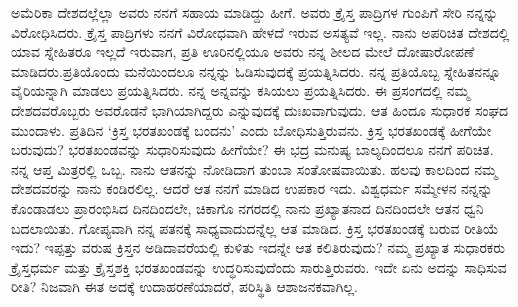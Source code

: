 ಅಮೆರಿಕಾ ದೇಶದಲ್ಲೆಲ್ಲಾ ಅವರು ನನಗೆ ಸಹಾಯ ಮಾಡಿದ್ದು ಹೀಗೆ. ಅವರು ಕ್ರೈಸ್ತ ಪಾದ್ರಿಗಳ ಗುಂಪಿಗೆ ಸೇರಿ ನನ್ನನ್ನು ವಿರೋಧಿಸಿದರು. ಕ್ರೈಸ್ತ ಪಾದ್ರಿಗಳು ನನಗೆ ವಿರೋಧವಾಗಿ ಹೇಳದೆ ಇರುವ ಅಸತ್ಯವೆ ಇಲ್ಲ. ನಾನು ಅಪರಿಚಿತ ದೇಶದಲ್ಲಿ ಯಾವ ಸ್ನೇಹಿತರೂ ಇಲ್ಲದೆ ಇರುವಾಗ, ಪ್ರತಿ ಊರಿ\-ನಲ್ಲಿಯೂ ಅವರು ನನ್ನ ಶೀಲದ ಮೇಲೆ ದೋಷಾರೋಪಣೆ ಮಾಡಿದರು.\break ಪ್ರತಿಯೊಂದು ಮನೆಯಿಂದಲೂ ನನ್ನನ್ನು ಓಡಿಸುವುದಕ್ಕೆ ಪ್ರಯತ್ನಿಸಿದರು. ನನ್ನ ಪ್ರತಿಯೊಬ್ಬ ಸ್ನೇಹಿತನನ್ನೂ ವೈರಿಯನ್ನಾಗಿ ಮಾಡಲು ಪ್ರಯತ್ನಿಸಿದರು. ನನ್ನ ಅನ್ನವನ್ನು ಕಸಿಯಲು ಪ್ರಯತ್ನಿಸಿದರು. ಈ ಪ್ರಸಂಗದಲ್ಲಿ ನಮ್ಮ ದೇಶದವ\-ರೊಬ್ಬರು ಅವರೊಡನೆ ಭಾಗಿಯಾಗಿದ್ದರು ಎನ್ನುವುದಕ್ಕೆ ದುಃಖವಾಗುವುದು. ಆತ ಹಿಂದೂ ಸುಧಾರಕ ಸಂಘದ ಮುಂದಾಳು. ಪ್ರತಿದಿನ ‘ಕ್ರಿಸ್ತ ಭರತಖಂಡಕ್ಕೆ ಬಂದನು’ ಎಂದು ಬೋಧಿಸುತ್ತಿರುವನು. ಕ್ರಿಸ್ತ ಭರತಖಂಡಕ್ಕೆ ಹೀಗೆಯೇ ಬರುವುದು? ಭರತಖಂಡವನ್ನು ಸುಧಾರಿಸುವುದು ಹೀಗೆಯೇ? ಈ ಭದ್ರ ಮನುಷ್ಯ ಬಾಲ್ಯದಿಂದಲೂ ನನಗೆ ಪರಿಚಿತ. ನನ್ನ ಆಪ್ತ ಮಿತ್ರರಲ್ಲಿ ಒಬ್ಬ. ನಾನು ಆತನನ್ನು ನೋಡಿದಾಗ ತುಂಬಾ ಸಂತೋಷವಾಯಿತು. ಹಲವು ಕಾಲದಿಂದ ನಮ್ಮ ದೇಶದವರನ್ನು ನಾನು ಕಂಡಿರಲಿಲ್ಲ. ಆದರೆ ಆತ ನನಗೆ ಮಾಡಿದ ಉಪಕಾರ ಇದು. ವಿಶ್ವಧರ್ಮ ಸಮ್ಮೇಳನ ನನ್ನನ್ನು ಕೊಂಡಾಡಲು ಪ್ರಾರಂಭಿಸಿದ ದಿನದಿಂದಲೇ, ಚಿಕಾಗೊ ನಗರದಲ್ಲಿ ನಾನು ಪ್ರಖ್ಯಾತನಾದ ದಿನದಿಂದಲೇ ಆತನ ಧ್ವನಿ ಬದಲಾಯಿತು. ಗೋಪ್ಯವಾಗಿ ನನ್ನ ಪತನಕ್ಕೆ ಸಾಧ್ಯವಾದುದನ್ನೆಲ್ಲ ಆತ ಮಾಡಿದ. ಕ್ರಿಸ್ತ ಭರತಖಂಡಕ್ಕೆ ಬರುವ ರೀತಿಯೆ ಇದು? ಇಪ್ಪತ್ತು ವರುಷ ಕ್ರಿಸ್ತನ ಅಡಿದಾವರೆಯಲ್ಲಿ ಕುಳಿತು ಇದನ್ನೇ ಆತ ಕಲಿತಿರುವುದು? ನಮ್ಮ ಪ್ರಖ್ಯಾತ ಸುಧಾರಕರು ಕ್ರೈಸ್ತಧರ್ಮ ಮತ್ತು ಕ್ರೈಸ್ತಶಕ್ತಿ ಭರತಖಂಡವನ್ನು ಉದ್ಧರಿಸುವುದೆಂದು ಸಾರುತ್ತಿರುವರು. ಇದೇ ಏನು ಅದನ್ನು ಸಾಧಿಸುವ ರೀತಿ? ನಿಜವಾಗಿ ಈತ ಅದಕ್ಕೆ ಉದಾ\-ಹರಣೆಯಾದರೆ, ಪರಿಸ್ಥಿತಿ ಆಶಾಜನಕವಾಗಿಲ್ಲ.

